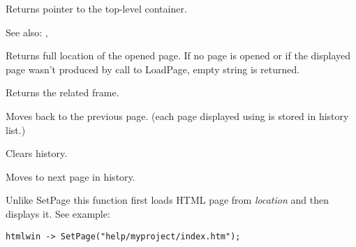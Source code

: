 \label{wxhtmlwindowgetinternalrepresentation}


Returns pointer to the top-level container.

See also: , 

\label{wxhtmlwindowgetopenedpage}


Returns full location of the opened page. If no page is opened or if the displayed page wasn't
produced by call to LoadPage, empty string is returned.

\label{wxhtmlwindowgetrelatedframe}


Returns the related frame.

\label{wxhtmlwindowhistoryback}


Moves back to the previous page. (each page displayed using 
 is stored in history list.)

\label{wxhtmlwindowhistoryclear}


Clears history.

\label{wxhtmlwindowhistoryforward}


Moves to next page in history.

\label{wxhtmlwindowloadpage}


Unlike SetPage this function first loads HTML page from {\it location}
and then displays it. See example:

\begin{verbatim}
htmlwin -> SetPage("help/myproject/index.htm");
\end{verbatim}


